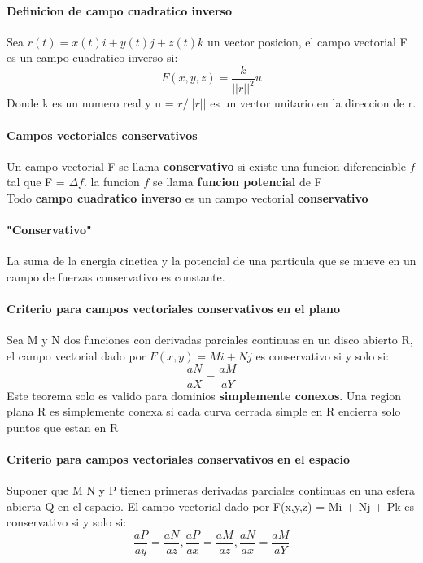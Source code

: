 \documentclass[11pt]{article}
\begin{document}
\paragraph{Definicion de campo cuadratico inverso}
Sea $r(t) = x(t)i + y(t)j + z(t)k$ un vector posicion, el campo vectorial F es un campo cuadratico inverso si:
\begin{equation*}
	F(x,y,z) = \dfrac{k}{||r||^2}u
\end{equation*}
Donde k es un numero real y u = $r/||r||$ es un vector unitario en la direccion de r.
\paragraph{Campos vectoriales conservativos}
Un campo vectorial F se llama \textbf{conservativo} si existe una funcion diferenciable $f$ tal que F = $\Delta f$. la funcion $f$ se llama \textbf{funcion potencial} de F\\
Todo \textbf{campo cuadratico inverso} es un campo vectorial \textbf{conservativo}\\
\paragraph{"Conservativo"} La suma de la energia cinetica y la potencial de una particula que se mueve en un campo de fuerzas conservativo es constante.
\paragraph{Criterio para campos vectoriales conservativos en el plano}
Sea M y N dos funciones con derivadas parciales continuas en un disco abierto R, el campo vectorial dado por $F(x,y) = Mi + Nj$ es conservativo si y solo si:
\begin{equation*}
	\dfrac{aN}{aX} = \dfrac{aM}{aY}
\end{equation*}
Este teorema solo es valido para dominios \textbf{simplemente conexos}. Una region plana R es simplemente conexa si cada curva cerrada simple en R encierra solo puntos que estan en R
\paragraph{Criterio para campos vectoriales conservativos en el espacio} Suponer que M N y P tienen primeras derivadas parciales continuas en una esfera abierta Q en el espacio. El campo vectorial dado por F(x,y,z) = Mi + Nj + Pk es conservativo si y solo si:
\begin{equation*}
	\dfrac{aP}{ay} = \dfrac{aN}{az}, \dfrac{aP}{ax} = \dfrac{aM}{az}, \dfrac{aN}{ax} = \dfrac{aM}{aY}
\end{equation*}
\end{document}
